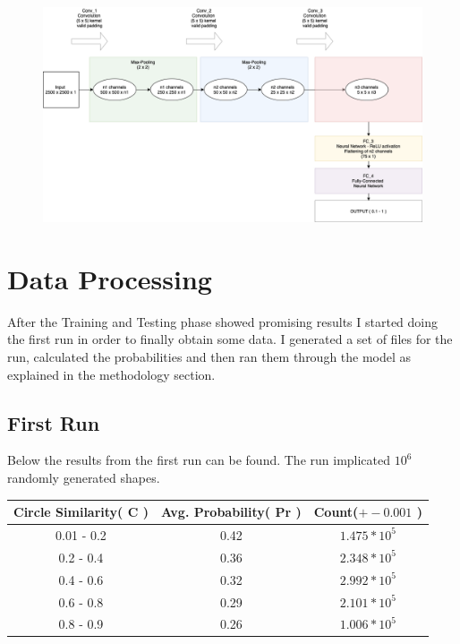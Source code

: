 \documentclass[9pt,onecolumn,oneside]{osajnl}
\begin{document}
\begin{figure}[h]
  \centering
  \begin{minipage}[b]{0.9\textwidth}
    \centering
    \includegraphics[width=\textwidth]{diagram.png}
  \end{minipage}
\end{figure}



\section{Data Processing}

After the Training and Testing phase showed promising results I started doing the first run in order to finally obtain some data. I generated a set of files for the run, calculated the probabilities and then ran them through the model as explained in the methodology section.

\subsection{First Run}

	Below the results from the first run can be found. The run implicated \(10^{6}\) randomly generated shapes. 

\begin{table}[h!]
\centering
 \begin{tabular}{||c c c||} 
 \hline
 Circle Similarity( C ) & Avg. Probability( Pr ) & Count(\(+-0.001\) )\\ [0.5ex] 
 \hline\hline
 0.01 - 0.2 & 0.42 & \(1.475*10^{5}\)\\ 
 0.2 - 0.4 & 0.36 & \(2.348*10^{5}\)\\
 0.4 - 0.6 & 0.32 & \(2.992*10^{5}\)\\
 0.6 -  0.8 & 0.29 & \(2.101*10^{5}\)\\
 0.8 - 0.9 & 0.26 & \(1.006*10^{5}\)\\ 
 \hline
\end{tabular}
\end{table}
\end{document}
